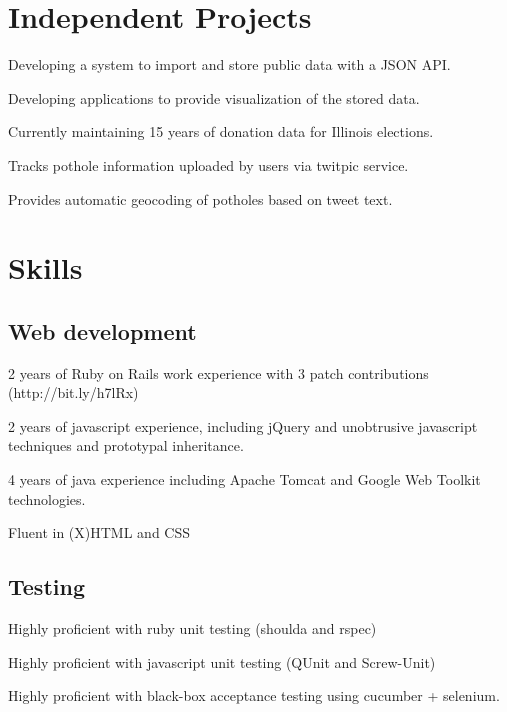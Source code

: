 \documentclass{resume}
\begin{document}
\section{Independent Projects}
\begin{compactitem}
  \item Developing a system to import and store public data with a JSON API.
  \item Developing applications to provide visualization of the stored data.
  \item Currently maintaining 15 years of donation data for Illinois elections.
\end{compactitem}

\begin{compactitem}
  \item Tracks pothole information uploaded by users via twitpic service.
  \item Provides automatic geocoding of potholes based on tweet text.
\end{compactitem}

\section{Skills}

\subsection{Web development}

\begin{compactitem}
  \item 2 years of Ruby on Rails work experience with 3 patch contributions (http://bit.ly/h7lRx)
  \item 2 years of javascript experience, including jQuery and unobtrusive javascript techniques and prototypal inheritance.
  \item 4 years of java experience including Apache Tomcat and Google Web Toolkit technologies.
  \item Fluent in (X)HTML and CSS
\end{compactitem}

\subsection{Testing}
\begin{compactitem}
  \item Highly proficient with ruby unit testing (shoulda and rspec)
  \item Highly proficient with javascript unit testing (QUnit and Screw-Unit)
  \item Highly proficient with black-box acceptance testing using cucumber + selenium.
\end{compactitem}
\end{document}

